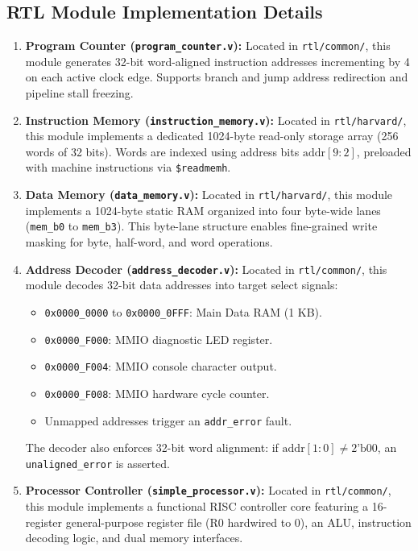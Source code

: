 \documentclass[conference]{IEEEtran}
\begin{document}
\subsection{RTL Module Implementation Details}
\begin{enumerate}
    \item \textbf{Program Counter (\texttt{program\_counter.v}):} Located in \texttt{rtl/common/}, this module generates 32-bit word-aligned instruction addresses incrementing by 4 on each active clock edge. Supports branch and jump address redirection and pipeline stall freezing.
    \item \textbf{Instruction Memory (\texttt{instruction\_memory.v}):} Located in \texttt{rtl/harvard/}, this module implements a dedicated 1024-byte read-only storage array (256 words of 32 bits). Words are indexed using address bits $\text{addr}[9:2]$, preloaded with machine instructions via \texttt{\$readmemh}.
    \item \textbf{Data Memory (\texttt{data\_memory.v}):} Located in \texttt{rtl/harvard/}, this module implements a 1024-byte static RAM organized into four byte-wide lanes (\texttt{mem\_b0} to \texttt{mem\_b3}). This byte-lane structure enables fine-grained write masking for byte, half-word, and word operations.
    \item \textbf{Address Decoder (\texttt{address\_decoder.v}):} Located in \texttt{rtl/common/}, this module decodes 32-bit data addresses into target select signals:
    \begin{itemize}
        \item \texttt{0x0000\_0000} to \texttt{0x0000\_0FFF}: Main Data RAM (1 KB).
        \item \texttt{0x0000\_F000}: MMIO diagnostic LED register.
        \item \texttt{0x0000\_F004}: MMIO console character output.
        \item \texttt{0x0000\_F008}: MMIO hardware cycle counter.
        \item Unmapped addresses trigger an \texttt{addr\_error} fault.
    \end{itemize}
    The decoder also enforces 32-bit word alignment: if $\text{addr}[1:0] \neq 2\text{'b00}$, an \texttt{unaligned\_error} is asserted.
    \item \textbf{Processor Controller (\texttt{simple\_processor.v}):} Located in \texttt{rtl/common/}, this module implements a functional RISC controller core featuring a 16-register general-purpose register file (R0 hardwired to 0), an ALU, instruction decoding logic, and dual memory interfaces.
\end{enumerate}
\end{document}
